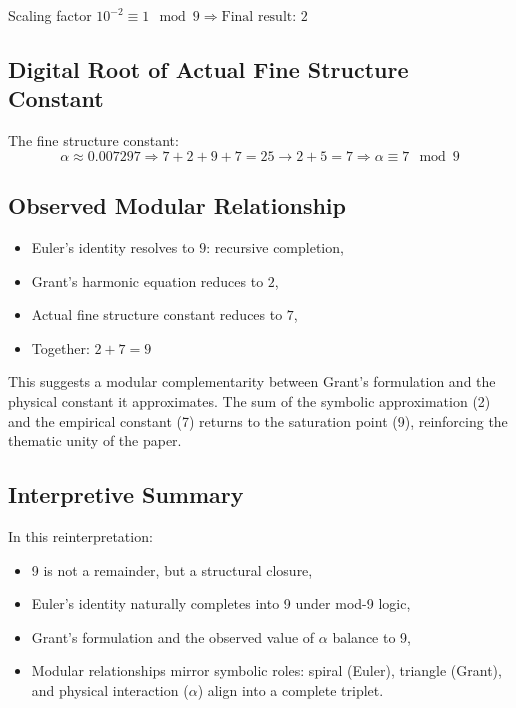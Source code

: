 \documentclass[12pt]{article}
\begin{document}
Scaling factor \( 10^{-2} \equiv 1 \mod 9 \Rightarrow \text{Final result: } 2 \)

\subsection*{Digital Root of Actual Fine Structure Constant}

The fine structure constant:
\[
\alpha \approx 0.007297 \Rightarrow 7 + 2 + 9 + 7 = 25 \rightarrow 2 + 5 = 7
\Rightarrow \alpha \equiv 7 \mod 9
\]

\subsection*{Observed Modular Relationship}

\begin{itemize}[leftmargin=1.5em]
    \item Euler's identity resolves to \( 9 \): recursive completion,
    \item Grant’s harmonic equation reduces to \( 2 \),
    \item Actual fine structure constant reduces to \( 7 \),
    \item Together: \( 2 + 7 = 9 \)
\end{itemize}

This suggests a modular complementarity between Grant’s formulation and the physical constant it approximates. The sum of the symbolic approximation (2) and the empirical constant (7) returns to the saturation point (9), reinforcing the thematic unity of the paper.

\subsection*{Interpretive Summary}

In this reinterpretation:
\begin{itemize}[leftmargin=1.5em]
    \item 9 is not a remainder, but a structural closure,
    \item Euler’s identity naturally completes into 9 under mod-9 logic,
    \item Grant’s formulation and the observed value of \(\alpha\) balance to 9,
    \item Modular relationships mirror symbolic roles: spiral (Euler), triangle (Grant), and physical interaction (\(\alpha\)) align into a complete triplet.
\end{itemize}
\end{document}
